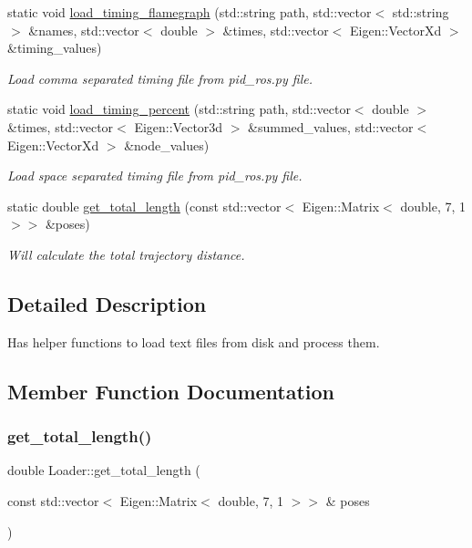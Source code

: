 \begin{DoxyCompactItemize}
static void \hyperlink{classov__eval_1_1Loader_aef2c74f0ad3dc52f0ce47bfe22ae6ed4}{load\+\_\+timing\+\_\+flamegraph} (std\+::string path, std\+::vector$<$ std\+::string $>$ \&names, std\+::vector$<$ double $>$ \&times, std\+::vector$<$ Eigen\+::\+Vector\+Xd $>$ \&timing\+\_\+values)
\begin{DoxyCompactList}\small\item\em Load {\itshape comma} separated timing file from pid\+\_\+ros.\+py file. \end{DoxyCompactList}\item 
static void \hyperlink{classov__eval_1_1Loader_aebb4fa55e3b3c9399dfebe11fe940112}{load\+\_\+timing\+\_\+percent} (std\+::string path, std\+::vector$<$ double $>$ \&times, std\+::vector$<$ Eigen\+::\+Vector3d $>$ \&summed\+\_\+values, std\+::vector$<$ Eigen\+::\+Vector\+Xd $>$ \&node\+\_\+values)
\begin{DoxyCompactList}\small\item\em Load space separated timing file from pid\+\_\+ros.\+py file. \end{DoxyCompactList}\item 
static double \hyperlink{classov__eval_1_1Loader_af4f3f47d194febe39fe1a97a915b7add}{get\+\_\+total\+\_\+length} (const std\+::vector$<$ Eigen\+::\+Matrix$<$ double, 7, 1 $>$$>$ \&poses)
\begin{DoxyCompactList}\small\item\em Will calculate the total trajectory distance. \end{DoxyCompactList}\end{DoxyCompactItemize}


\subsection{Detailed Description}
Has helper functions to load text files from disk and process them. 

\subsection{Member Function Documentation}
\mbox{\label{classov__eval_1_1Loader_af4f3f47d194febe39fe1a97a915b7add}} 
\subsubsection{\texorpdfstring{get\+\_\+total\+\_\+length()}{get\_total\_length()}}
{\footnotesize\ttfamily double Loader\+::get\+\_\+total\+\_\+length (\begin{DoxyParamCaption}\item[{const std\+::vector$<$ Eigen\+::\+Matrix$<$ double, 7, 1 $>$$>$ \&}]{poses }\end{DoxyParamCaption})\hspace{0.3cm}{\ttfamily [static]}}



